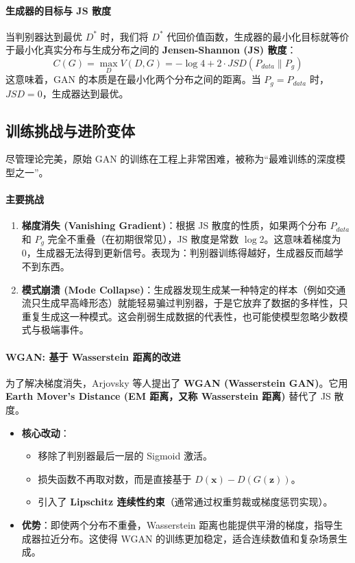 \paragraph{生成器的目标与 JS 散度}
当判别器达到最优 $D^*$ 时，我们将 $D^*$ 代回价值函数，生成器的最小化目标就等价于最小化真实分布与生成分布之间的 \textbf{Jensen-Shannon (JS) 散度}：
\begin{equation}
    C(G) = \max_D V(D, G) = -\log 4 + 2 \cdot JSD(P_{data} \| P_g)
\end{equation}
这意味着，GAN 的本质是在最小化两个分布之间的距离。当 $P_g = P_{data}$ 时，$JSD=0$，生成器达到最优。

\subsection{训练挑战与进阶变体}

尽管理论完美，原始 GAN 的训练在工程上非常困难，被称为“最难训练的深度模型之一”。

\paragraph{主要挑战}
\begin{enumerate}
    \item \textbf{梯度消失 (Vanishing Gradient)}：根据 JS 散度的性质，如果两个分布 $P_{data}$ 和 $P_g$ 完全不重叠（在初期很常见），JS 散度是常数 $\log 2$。这意味着梯度为 0，生成器无法得到更新信号。表现为：判别器训练得越好，生成器反而越学不到东西。
    \item \textbf{模式崩溃 (Mode Collapse)}：生成器发现生成某一种特定的样本（例如交通流只生成早高峰形态）就能轻易骗过判别器，于是它放弃了数据的多样性，只重复生成这一种模式。这会削弱生成数据的代表性，也可能使模型忽略少数模式与极端事件。
\end{enumerate}







\paragraph{WGAN: 基于 Wasserstein 距离的改进}
为了解决梯度消失，Arjovsky 等人提出了 \textbf{WGAN (Wasserstein GAN)}。它用 \textbf{Earth Mover's Distance (EM 距离，又称 Wasserstein 距离)} 替代了 JS 散度。
\begin{itemize}
    \item \textbf{核心改动}：
        \begin{itemize}
            \item 移除了判别器最后一层的 Sigmoid 激活。
            \item 损失函数不再取对数，而是直接基于 $D(\mathbf{x}) - D(G(\mathbf{z}))$。
            \item 引入了 \textbf{Lipschitz 连续性约束}（通常通过权重剪裁或梯度惩罚实现）。
        \end{itemize}
    \item \textbf{优势}：即使两个分布不重叠，Wasserstein 距离也能提供平滑的梯度，指导生成器拉近分布。这使得 WGAN 的训练更加稳定，适合连续数值和复杂场景生成。
\end{itemize}

